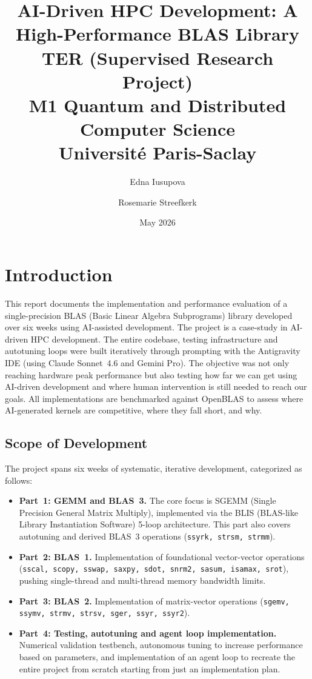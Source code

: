 \documentclass[11pt,a4paper]{article}
\title{\textbf{AI-Driven HPC Development: A High-Performance BLAS Library}\\[6pt]
  \large{TER (Supervised Research Project)\\ M1 Quantum and Distributed Computer Science\\ Universit\'{e} Paris-Saclay}}
\author{Edna Iusupova \and Rosemarie Streefkerk}
\date{May 2026}
\begin{document}
\maketitle
\tableofcontents
\newpage

\section*{Introduction}

This report documents the implementation and performance evaluation of a
single-precision BLAS (Basic Linear Algebra Subprograms) library developed over six weeks using AI-assisted development. The project is a case-study in AI-driven HPC development.
The entire codebase, testing infrastructure and autotuning loops were built iteratively through prompting with the Antigravity IDE
(using Claude Sonnet~4.6 and Gemini Pro). The objective was not only reaching hardware peak
performance but also testing how far we can get using AI-driven development and where human intervention is still needed to reach our goals.
All implementations are benchmarked against OpenBLAS to assess where AI-generated
kernels are competitive, where they fall short, and why.

\subsection*{Scope of Development}
The project spans six weeks of systematic, iterative development, categorized as follows:
\begin{itemize}
  \item \textbf{Part~1: GEMM and BLAS~3.} The core focus is SGEMM (Single Precision General Matrix Multiply), implemented via the BLIS (BLAS-like Library Instantiation Software) 5-loop architecture. This part also covers autotuning and derived BLAS~3 operations (\texttt{ssyrk, strsm, strmm}).
  \item \textbf{Part~2: BLAS~1.} Implementation of foundational vector-vector operations (\texttt{sscal, scopy, sswap, saxpy, sdot, snrm2, sasum, isamax, srot}), pushing single-thread and multi-thread memory bandwidth limits.
  \item \textbf{Part~3: BLAS~2.} Implementation of matrix-vector operations (\texttt{sgemv, ssymv, strmv, strsv, sger, ssyr, ssyr2}).
  \item \textbf{Part~4: Testing, autotuning and agent loop implementation.} Numerical validation testbench, autonomous tuning to increase performance based on parameters, and implementation of an agent loop to recreate the entire project from scratch starting from just an implementation plan. 
\end{itemize}
\end{document}
